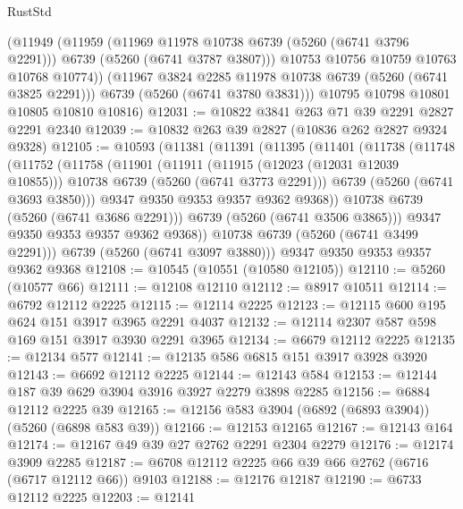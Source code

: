 \begin{lexlean}{RustStd}
\begin{coremodule}
          (@11949
            (@11959
              (@11969 @11978 @10738 @6739 (@5260 (@6741 @3796 @2291)))
              @6739
              (@5260 (@6741 @3787 @3807)))
            @10753
            @10756
            @10759
            @10763
            @10768
            @10774))
        (@11967 @3824 @2285 @11978 @10738 @6739 (@5260 (@6741 @3825 @2291)))
        @6739
        (@5260 (@6741 @3780 @3831)))
      @10795
      @10798
      @10801
      @10805
      @10810
      @10816)
@12031 := @10822 @3841 @263 @71 @39 @2291 @2827 @2291 @2340
@12039 := @10832 @263 @39 @2827 (@10836 @262 @2827 @9324 @9328)
@12105 := @10593
    (@11381
      (@11391
        (@11395
          (@11401
            (@11738
              (@11748
                (@11752
                  (@11758
                    (@11901
                      (@11911
                        (@11915 (@12023 (@12031 @12039 @10855)))
                        @10738
                        @6739
                        (@5260 (@6741 @3773 @2291)))
                      @6739
                      (@5260 (@6741 @3693 @3850)))
                    @9347
                    @9350
                    @9353
                    @9357
                    @9362
                    @9368))
                @10738
                @6739
                (@5260 (@6741 @3686 @2291)))
              @6739
              (@5260 (@6741 @3506 @3865)))
            @9347
            @9350
            @9353
            @9357
            @9362
            @9368))
        @10738
        @6739
        (@5260 (@6741 @3499 @2291)))
      @6739
      (@5260 (@6741 @3097 @3880)))
    @9347
    @9350
    @9353
    @9357
    @9362
    @9368
@12108 := @10545 (@10551 (@10580 @12105))
@12110 := @5260 (@10577 @66)
@12111 := @12108 @12110
@12112 := @8917 @10511
@12114 := @6792 @12112 @2225
@12115 := @12114 @2225
@12123 := @12115 @600 @195 @624 @151 @3917 @3965 @2291 @4037
@12132 := @12114 @2307 @587 @598 @169 @151 @3917 @3930 @2291 @3965
@12134 := @6679 @12112 @2225
@12135 := @12134 @577
@12141 := @12135 @586 @6815 @151 @3917 @3928 @3920
@12143 := @6692 @12112 @2225
@12144 := @12143 @584
@12153 := @12144 @187 @39 @629 @3904 @3916 @3927 @2279 @3898 @2285
@12156 := @6884 @12112 @2225 @39
@12165 := @12156 @583 @3904 (@6892 (@6893 @3904)) (@5260 (@6898 @583 @39))
@12166 := @12153 @12165
@12167 := @12143 @164
@12174 := @12167 @49 @39 @27 @2762 @2291 @2304 @2279
@12176 := @12174 @3909 @2285
@12187 := @6708 @12112 @2225 @66 @39 @66 @2762 (@6716 (@6717 @12112 @66)) @9103
@12188 := @12176 @12187
@12190 := @6733 @12112 @2225
@12203 := @12141

\end{coremodule}
\end{lexlean}
